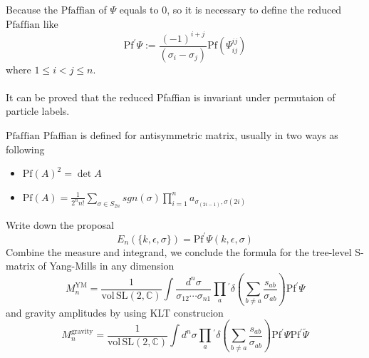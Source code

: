 \documentclass{beamer}
\begin{document}
\begin{frame}
    Because the $\mathrm{Pfaffian}$ of $\Psi$ equals to 0, so it is necessary to define the reduced $\mathrm{Pfaffian}$ like 
    \begin{equation*}
            \boxed{
            \mathrm{Pf}^{\prime}\Psi:=\frac{(-1)^{i+j}}{(\sigma_i-\sigma_j)}\mathrm{Pf}(\Psi_{ij}^{ij})}
    \end{equation*}
    where $1\leq i< j\leq n$.
    \\ \hspace*{\fill}\\
    It can be proved that the reduced Pfaffian is invariant under permutaion of \alert{particle labels}.
    \pause
    \begin{alertblock}{$\mathrm{Pfaffian}$}
        Pfaffian is defined for antisymmetric matrix, usually in two ways as following
        \begin{itemize}
            \item  $\mathrm{Pf}(A)^2=\det A$
            \item  $\mathrm{Pf}(A)=\frac{1}{2^n n!}\sum_{\sigma \in S_{2n}}sgn(\sigma)\prod_{i=1}^n a_{\sigma_{(2i-1)},\sigma(2i)}$
        \end{itemize}
    \end{alertblock}
\end{frame}
\begin{frame}
    Write down the proposal
    \alert{
    \begin{equation*}
        E_n(\{k,\epsilon,\sigma\})=\mathrm{Pf}^\prime \Psi(k,\epsilon,\sigma)
    \end{equation*}}
    Combine the measure and integrand, we conclude the formula for the tree-level S-matrix of Yang-Mills in any dimension
    \begin{equation*}
        M_n^{\mathrm{YM}}=\frac{1}{\mathrm{vol\,SL}(2,\mathbb{C})}\int\frac{d^n\sigma}{\sigma_{12}\cdots\sigma_{n1}}\prod_{a}{}^{\prime}\delta{\left(\sum_{b\neq a}\frac{s_{ab}}{\sigma_{ab}}\right)}\mathrm{Pf}^{\prime}\Psi
    \end{equation*}
    and gravity amplitudes by using KLT construcion
    \begin{equation*}
        M_n^{\mathrm{gravity}}=\frac{1}{\mathrm{vol\,SL}(2,\mathbb{C})}\int d^n\sigma\prod_{a}{}^{\prime}\delta{\left(\sum_{b\neq a}\frac{s_{ab}}{\sigma_{ab}}\right)}\mathrm{Pf}^{\prime}\Psi\mathrm{Pf}^{\prime}\tilde{\Psi}
    \end{equation*}
\end{frame}
\end{document}

